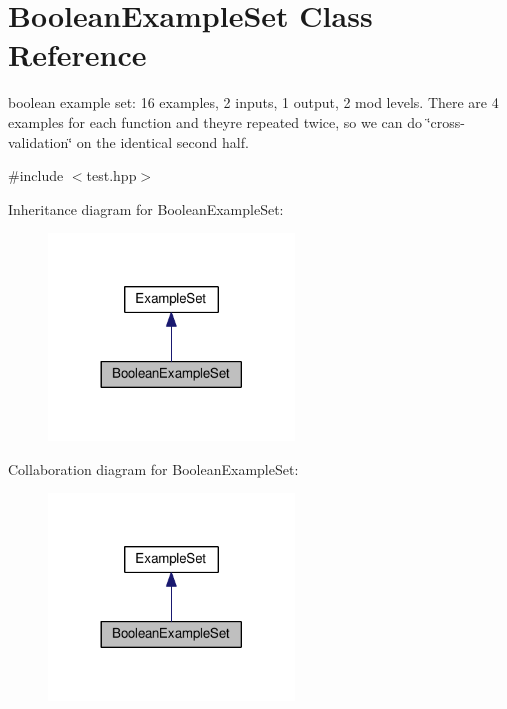 \hypertarget{classBooleanExampleSet}{}\section{Boolean\+Example\+Set Class Reference}
\label{classBooleanExampleSet}


boolean example set\+: 16 examples, 2 inputs, 1 output, 2 mod levels. There are 4 examples for each function and they\textquotesingle{}re repeated twice, so we can do \char`\"{}cross-\/validation\char`\"{} on the identical second half.  




{\ttfamily \#include $<$test.\+hpp$>$}



Inheritance diagram for Boolean\+Example\+Set\+:
\nopagebreak
\begin{figure}[H]
\begin{center}
\leavevmode
\includegraphics[width=185pt]{classBooleanExampleSet__inherit__graph}
\end{center}
\end{figure}


Collaboration diagram for Boolean\+Example\+Set\+:
\nopagebreak
\begin{figure}[H]
\begin{center}
\leavevmode
\includegraphics[width=185pt]{classBooleanExampleSet__coll__graph}
\end{center}
\end{figure}

